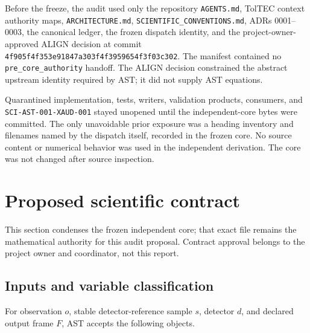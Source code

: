\documentclass[11pt]{article}
\newcommand{\code}[1]{\nolinkurl{#1}}
\newcommand{\status}[1]{\nolinkurl{#1}}
\begin{document}
Before the freeze, the audit used only the repository \code{AGENTS.md}, TolTEC
context authority maps, \code{ARCHITECTURE.md},
\code{SCIENTIFIC_CONVENTIONS.md}, ADRs 0001--0003, the canonical ledger,
the frozen dispatch identity, and the project-owner-approved ALIGN decision at
commit \code{4f905f4f353e91847a303f4f3959654f3f03c302}.  The manifest contained no
\status{pre_core_authority} handoff.  The ALIGN decision constrained the
abstract upstream identity required by AST; it did not supply AST equations.

Quarantined implementation, tests, writers, validation products, consumers,
and \code{SCI-AST-001-XAUD-001} stayed unopened until the independent-core
bytes were committed.  The only unavoidable prior exposure was a heading
inventory and filenames named by the dispatch itself, recorded in the frozen
core. No source content or numerical behavior was used in the independent
derivation. The core was not changed after source inspection.

\section{Proposed scientific contract}

This section condenses the frozen independent core; that exact file remains the
mathematical authority for this audit proposal.  Contract approval belongs to
the project owner and coordinator, not this report.

\subsection{Inputs and variable classification}

For observation $o$, stable detector-reference sample $s$, detector $d$, and
declared output frame $F$, AST accepts the following objects.
\end{document}
